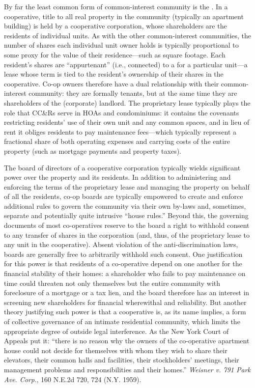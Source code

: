 By far the least common form of common-interest community is the
. In a cooperative, title to all real property in the
community (typically an apartment building) is held by a cooperative
corporation, whose shareholders are the residents of individual units. As with
the other common-interest communities, the number of shares each individual unit
owner holds is typically proportional to some proxy for the value of their
residence---such as square footage. Each resident's shares are ``appurtenant''
(i.e., connected) to a  for a particular unit---a
lease whose term is tied to the resident's ownership of their shares in the
cooperative. Co-op owners therefore have a dual relationship with their
common-interest community: they are formally tenants, but at the same time they
are shareholders of the (corporate) landlord. The proprietary lease typically
plays the role that CC\&Rs serve in HOAs and condominiums: it contains the
covenants restricting residents' use of their own unit and any common spaces,
and in lieu of rent it obliges residents to pay maintenance fees---which
typically represent a fractional share of both operating expenses and carrying
costs of the entire property (such as mortgage payments and property taxes).

The board of directors of a cooperative corporation typically wields significant
power over the property and its residents. In addition to administering and
enforcing the terms of the proprietary lease and managing the property on behalf
of all the residents, co-op boards are typically empowered to create and enforce
additional rules to govern the community via their own by-laws and, sometimes,
separate and potentially quite intrusive ``house rules.'' Beyond this, the
governing documents of most co-operatives reserve to the board a right to
withhold consent to any transfer of shares in the corporation (and, thus, of the
proprietary lease to any unit in the cooperative). Absent violation of the
anti-discrimination laws, boards are generally free to arbitrarily withhold such
consent. One justification for this power is that residents of a co-operative
depend on one another for the financial stability of their homes: a shareholder
who fails to pay maintenance on time could threaten not only themselves but the
entire community with foreclosure of a mortgage or a tax lien, and the board
therefore has an interest in screening new shareholders for financial
wherewithal and reliability. But another theory justifying such power is that a
cooperative is, as its name implies, a form of collective governance of an
intimate residential community, which limits the appropriate degree of outside
legal interference. As the New York Court of Appeals put it: ``there is no
reason why the owners of the co-operative apartment house could not decide for
themselves with whom they wish to share their elevators, their common halls and
facilities, their stockholders' meetings, their management problems and
responsibilities and their homes.'' \emph{Weisner v. 791 Park Ave. Corp.}, 160
N.E.2d 720, 724 (N.Y. 1959).

